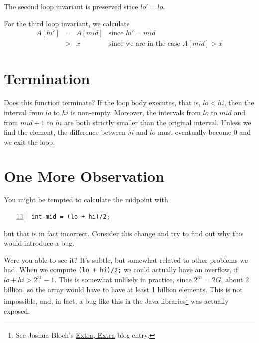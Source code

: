 \begin{description}
\begin{description}
    The second loop invariant is preserved since $\mathit{lo}' =
    \mathit{lo}$.

    For the third loop invariant, we calculate
    $$
    \begin{array}{lcll}
       A[\mathit{hi}'] &=& A[\mathit{mid}]
     & \text{since } \mathit{hi}' = \mathit{mid}
    \\                 &>& x
     & \text{since we are in the case } A[\mathit{mid}] > x
    \end{array}
    $$
  \end{description}
\end{description}


\section{Termination}
\label{sec:binsearch:term}

Does this function terminate?  If the loop body executes, that is,
$\mathit{lo} < \mathit{hi}$, then the interval from
$\mathit{lo}$ to $\mathit{hi}$ is non-empty.  Moreover, the
intervals from $\mathit{lo}$ to $\mathit{mid}$ and from
$\mathit{mid}+1$ to $\mathit{hi}$ are both strictly smaller than
the original interval.  Unless we find the element, the difference
between $\mathit{hi}$ and $\mathit{lo}$ must eventually become
$0$ and we exit the loop.


\section{One More Observation}
\label{sec:binsearch:edge}

You might be tempted to calculate the midpoint with
\begin{lstlisting}[language={[C0]C}, numbers=left, firstnumber=13]
int mid = (lo + hi)/2;
\end{lstlisting}
but that is in fact incorrect.  Consider this change and
try to find out why this would introduce a bug.

\clearpage

Were you able to see it?  It's subtle, but somewhat related to other problems
we had.  When we compute \lstinline'(lo + hi)/2;' we could actually have an
overflow, if $\mathit{lo} + \mathit{hi} > 2^{31}-1$.  This is somewhat
unlikely in practice, since $2^{31} = 2G$, about 2 billion, so the array would
have to have at least 1 billion elements.  This is not impossible, and, in
fact, a bug like this in the Java libraries\footnote{See Joshua Bloch's \href{http://googleresearch.blogspot.com/2006/06/extra-extra-read-all-about-it-nearly.html}{Extra, Extra} blog entry.} was actually exposed. %


